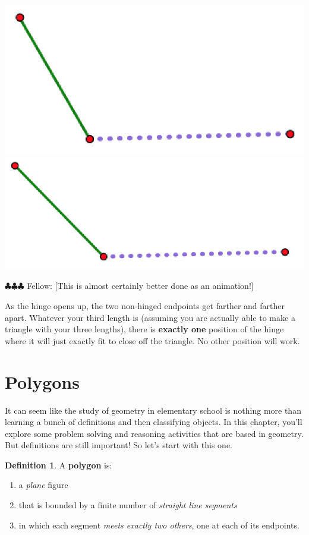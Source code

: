 \documentclass[12pt, reqno]{amsart}
\theoremstyle{remark}
\theoremstyle{definition}
\newtheorem{define}[thm]{Definition}
\numberwithin{equation}{section}  %
\newcommand{\fellow}[1]{{\color{magenta} \sf $\clubsuit\clubsuit\clubsuit$ Fellow: [#1]}}
\begin{document}
\begin{center}
\includegraphics[scale = .4]{open6}
\quad
\includegraphics[scale = .4]{open7}
\end{center}

\fellow{This is almost certainly better done as an animation!}

As the hinge opens up, the two non-hinged endpoints get farther and farther apart.  Whatever your third length is (assuming you are actually able to make a triangle with your three lengths), there is {\bf exactly one} position of the hinge where it will just exactly fit to close off the triangle.  No other position will work.






\newpage

\section{Polygons}
It can seem like the study of geometry in elementary school is nothing more than learning a bunch of definitions and then classifying objects.  In this chapter, you'll explore some problem solving and reasoning activities that are based in geometry.  But definitions are still important!  So let's start with this one.

\bigskip

\begin{define}
A {\bf polygon} is:
\begin{enumerate}
\item
 a \emph{plane} figure
 \item
  that is bounded by a finite number of \emph{straight line segments}
  \item
  in which each segment \emph{meets exactly two others}, one at each of its endpoints.
\end{enumerate}
\end{define}
\end{document}
